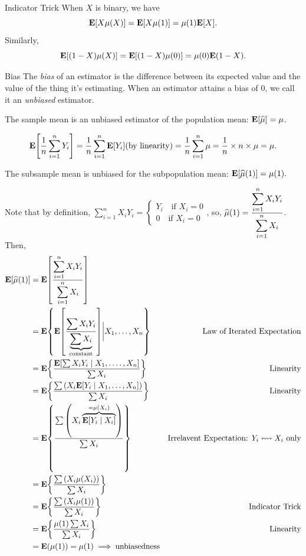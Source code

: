 \begin{thm}{Indicator Trick}
	When $X$ is binary, we have \[\vb{E}\qty[X\mu(X)]=\vb{E}\qty[X\mu(1)]=\mu(1)\vb{E}[X].\] Similarly, \[\vb{E}[(1-X)\mu(X)]=\vb{E}\qty[(1-X)\mu(0)]=\mu(0)\vb{E}(1-X).\]
\end{thm}
\begin{df}{Bias}
	The \textit{bias} of an estimator is the difference between its expected value and the value of the thing it's estimating. When an estimator attains a bias of $0$, we call it an \textit{unbiased} estimator.
\end{df}
\begin{clm}{}
	The sample mean is an unbiased estimator of the population mean:  $\vb{E}\qty[\widehat{\mu}]=\mu$.
\end{clm}
\begin{prf}
	\[\vb{E}\qty[\dfrac{1}{n}\sum_{i=1}^nY_i]=\dfrac{1}{n}\sum_{i=1}^n\vb{E}[Y_i] (\text{by linearity})=\dfrac{1}{n}\sum_{i=1}^n\mu=\dfrac{1}{n}\times n\times\mu=\mu.\]
\end{prf}
\begin{clm}
	The subsample mean is unbiased for the subpopulation mean: $\vb{E}\qty[\widehat{\mu}(1)]=\mu(1).$
\end{clm}
\begin{prf}
	Note that by definition, $\sum_{i=1}^nX_iY_i=\begin{cases}Y_i\quad\text{if }X_i=0\\0\quad\text{if }X_i=0\end{cases}$, so, $\widehat{\mu}(1)=\dfrac{\displaystyle\sum_{i=1}^nX_iY_i}{\displaystyle\sum_{i=1}^nX_i}$. Then, 
	\begin{align*}
		\vb{E}\qty[\widehat{\mu}(1)]&=\vb{E}\qty[\dfrac{\displaystyle\sum_{i=1}^nX_iY_i}{\displaystyle\sum_{i=1}^nX_i}]\\
		&=\vb{E}\qty{\vb{E}\qty[\dfrac{\displaystyle\sum X_iY_i}{\underbrace{\sum X_i}_\text{constant}}]\bigg|X_1,\dots,X_n}&\text{Law of Iterated Expectation}\\
		&=\vb{E}\qty{\dfrac{\vb{E}\qty[\sum X_iY_i\mid X_1,.\dots,X_n]}{\sum X_i}}&\text{Linearity}\\
		&=\vb{E}\qty{\dfrac{\sum\qty(X_i\vb{E}\qty[Y_i\mid X_1,\dots,X_n])}{\sum X_i}}&\text{Linearity}\\
		&=\vb{E}\qty{\dfrac{\sum\qty(X_i\overbrace{\vb{E}\qty[Y_i\mid X_i]}^{=\mu(X_i)})}{\sum X_i}}&\text{Irrelavent Expectation: }Y_i\leftrightsquigarrow X_i \text{ only}\\
		&=\vb{E}\qty{\dfrac{\sum\qty(X_i\mu(X_i))}{\sum X_i}}\\
		&=\vb{E}\qty{\dfrac{\sum\qty(X_i\mu(1))}{\sum X_i}}&\text{Indicator Trick}\\
		&=\vb{E}\qty{\dfrac{\mu(1)\sum X_i}{\sum X_i}}&\text{Linearity}\\
		&=\vb{E}\qty(\mu(1))=\mu(1)\implies\text{unbiasedness}
	\end{align*}
\end{prf}
